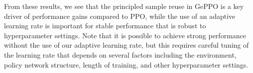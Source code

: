 \documentclass{article}
\begin{document}
From these results, we see that the principled sample reuse in GePPO is a key driver of performance gains compared to PPO, while the use of an adaptive learning rate is important for stable performance that is robust to hyperparameter settings. Note that it is possible to achieve strong performance without the use of our adaptive learning rate, but this requires careful tuning of the learning rate that depends on several factors including the environment, policy network structure, length of training, and other hyperparameter settings.

\end{document}
